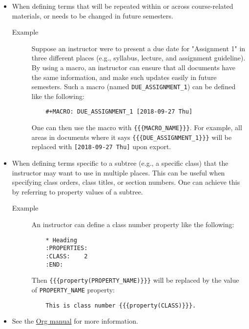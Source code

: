 \documentclass[10pt,article]{article}
\begin{document}
\begin{itemize}
\item When defining terms that will be repeated within or across course-related
materials, or needs to be changed in future semesters.
\begin{description}
\item[{Example}] Suppose an instructor were to present a due date for
"Assignment 1" in three different places (e.g., syllabus,
lecture, and assignment guideline). By using a macro, an
instructor can ensure that all documents have the same
information, and make such updates easily in future
semesters. Such a macro (named \texttt{DUE\_ASSIGNMENT\_1}) can be
defined like the following:

\begin{verbatim}
    #+MACRO: DUE_ASSIGNMENT_1 [2018-09-27 Thu]
\end{verbatim}

One can then use the macro with \texttt{\{\{\{MACRO\_NAME\}\}\}}. For example, all
areas in documents where it says \texttt{\{\{\{DUE\_ASSIGNMENT\_1\}\}\}} will be
replaced with \texttt{[2018-09-27 Thu]} upon export.
\end{description}

\item When defining terms specific to a subtree (e.g., a specific class) that
the instructor may want to use in multiple places. This can be useful when
specifying class orders, class titles, or section numbers. One
can achieve this by referring to property values of a subtree.
\begin{description}
\item[{Example}] An instructor can define a class number property like the following:

\begin{verbatim}
    * Heading
    :PROPERTIES:
    :CLASS:    2
    :END:
\end{verbatim}

Then \texttt{\{\{\{property(PROPERTY\_NAME)\}\}\}} will be replaced by
the value of \texttt{PROPERTY\_NAME} property:

\begin{verbatim}
    This is class number {{{property(CLASS)}}}.
\end{verbatim}
\end{description}

\item See the \href{https://orgmode.org/manual/Macro-replacement.html}{Org manual} for more information.
\end{itemize}
\end{document}
